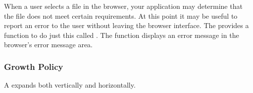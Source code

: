 When a user selects a file in the browser, your application may
determine that the file does not meet certain requirements.  At this
point it may be useful to report an error to the user without leaving
the browser interface.  The  provides a function to do
just this called .  The function displays an
error message in the browser's error message area.


\subsubsection{Growth Policy}

A  expands both vertically and horizontally.
